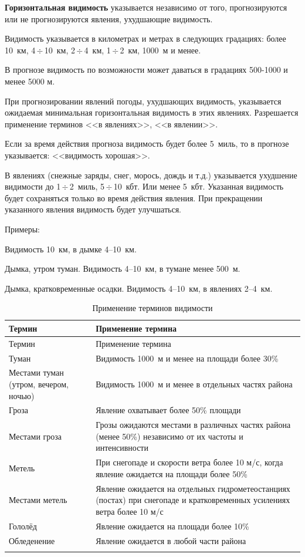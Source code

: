 \documentclass[a4paper, 12pt, twoside, draft, book, russian, fittopage, cyremdash, openright]{ncc}
\newcommand{\otdo}{\,\ensuremath{\div}\,}
\begin{document}
\textbf{Горизонтальная видимость} указывается независимо от того,
прогнозируются или не прогнозируются явления, ухудшающие видимость.

Видимость указывается в километрах и метрах в следующих градациях:
более 10~км, 4\otdo10~км, 2\otdo4~км, 1\otdo2~км, 1000~м и менее.

В прогнозе видимость по возможности может даваться в градациях
500-1000 и менее 5000 м.

При прогнозировании явлений погоды, ухудшающих видимость, указывается
ожидаемая минимальная горизонтальная видимость в этих
явлениях. Разрешается применение терминов <<в явлениях>>,
<<в явлении>>.

Если за время действия прогноза видимость будет более 5~миль, то в
прогнозе указывается: <<видимость хорошая>>.

В явлениях (снежные заряды, снег, морось, дождь и т.д.) указывается
ухудшение видимости до 1\otdo2~миль, 5\otdo10~кбт. Или менее
5~кбт. Указанная видимость будет сохраняться только во время действия
явления. При прекращении указанного явления видимость будет
улучшаться.

Примеры:
\begin{list}{}{}
\item Видимость 10~км, в дымке 4--10~км.
\item Дымка, утром туман. Видимость 4--10~км, в тумане менее 500~м.
\item Дымка, кратковременные осадки. Видимость 4--10~км, в явлениях 2--4~км.
\end{list}

\begin{longtable}{p{}|p{}}
  \toprule
  Термин & Применение термина \\
  \midrule
  \endfirsthead
  \toprule
  Термин & Применение термина \\
  \midrule
  \endhead
  Туман
         & Видимость 1000~м и менее на площади более 30\% \\
  \midrule
  Местами туман (утром, вечером, ночью)
         & Видимость 1000~м и менее в отдельных частях района \\
  \midrule
  Гроза
         & Явление охватывает более 50\% площади \\
  \midrule
  Местами гроза
         & Грозы ожидаются местами в различных частях района (менее 50\%) независимо от их частоты и интенсивности \\
  \midrule
  Метель
         & При снегопаде и скорости ветра более 10 м/с, когда явление ожидается на площади более 50\% \\
  \midrule
  Местами метель
         & Явление ожидается на отдельных гидрометеостанциях (постах) при снегопаде и кратковременных усилениях ветра более 10 м/с \\
  \midrule
  Гололёд
         & Явление ожидается на площади более 10\% \\
  \midrule
  Обледенение
         & Явление ожидается в любой части района \\
  \bottomrule
  \caption{Применение терминов видимости}
\end{longtable}
\end{document}
